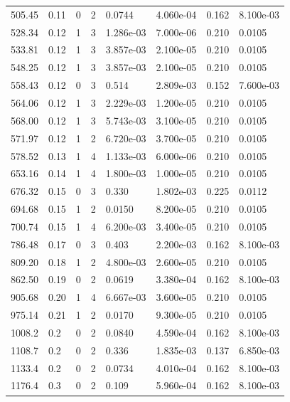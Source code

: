 \documentclass[preview]{standalone}
\begin{document}
{{\begin{tabular}{L{1.2cm}C{1.2cm} C{0.3cm}C{0.5cm} C{1.4cm}C{1.4cm} C{1.4cm}C{1.4cm}}
  505.45  &  0.11  & 0     &  2 &  0.0744  & 4.060e-04  & 0.162 &  8.100e-03   \\ 
  528.34  &  0.12  & 1     &  3 &  1.286e-03  & 7.000e-06  & 0.210 &  0.0105   \\ 
  533.81  &  0.12  & 1     &  3 &  3.857e-03  & 2.100e-05  & 0.210 &  0.0105   \\ 
  548.25  &  0.12  & 1     &  3 &  3.857e-03  & 2.100e-05  & 0.210 &  0.0105   \\ 
  558.43  &  0.12  & 0     &  3 &  0.514  & 2.809e-03  & 0.152 &  7.600e-03   \\ 
  564.06  &  0.12  & 1     &  3 &  2.229e-03  & 1.200e-05  & 0.210 &  0.0105   \\ 
  568.00  &  0.12  & 1     &  3 &  5.743e-03  & 3.100e-05  & 0.210 &  0.0105   \\ 
  571.97  &  0.12  & 1     &  2 &  6.720e-03  & 3.700e-05  & 0.210 &  0.0105   \\ 
  578.52  &  0.13  & 1     &  4 &  1.133e-03  & 6.000e-06  & 0.210 &  0.0105   \\ 
  653.16  &  0.14  & 1     &  4 &  1.800e-03  & 1.000e-05  & 0.210 &  0.0105   \\ 
  676.32  &  0.15  & 0     &  3 &  0.330  & 1.802e-03  & 0.225 &  0.0112   \\ 
  694.68  &  0.15  & 1     &  2 &  0.0150  & 8.200e-05  & 0.210 &  0.0105   \\ 
  700.74  &  0.15  & 1     &  4 &  6.200e-03  & 3.400e-05  & 0.210 &  0.0105   \\ 
  786.48  &  0.17  & 0     &  3 &  0.403  & 2.200e-03  & 0.162 &  8.100e-03   \\ 
  809.20  &  0.18  & 1     &  2 &  4.800e-03  & 2.600e-05  & 0.210 &  0.0105   \\ 
  862.50  &  0.19  & 0     &  2 &  0.0619  & 3.380e-04  & 0.162 &  8.100e-03   \\ 
  905.68  &  0.20  & 1     &  4 &  6.667e-03  & 3.600e-05  & 0.210 &  0.0105   \\ 
  975.14  &  0.21  & 1     &  2 &  0.0170  & 9.300e-05  & 0.210 &  0.0105   \\ 
  1008.2  &   0.2  & 0     &  2 &  0.0840  & 4.590e-04  & 0.162 &  8.100e-03   \\ 
  1108.7  &   0.2  & 0     &  2 &  0.336  & 1.835e-03  & 0.137 &  6.850e-03   \\ 
  1133.4  &   0.2  & 0     &  2 &  0.0734  & 4.010e-04  & 0.162 &  8.100e-03   \\ 
  1176.4  &   0.3  & 0     &  2 &  0.109  & 5.960e-04  & 0.162 &  8.100e-03   \\ 

\end{tabular}}}
\end{document}
